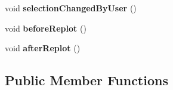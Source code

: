 \begin{DoxyCompactItemize}
\item 
void {\bfseries selection\+Changed\+By\+User} ()\hypertarget{class_q_custom_plot_a500c64a109bc773c973ad274f2fa4190}{}\label{class_q_custom_plot_a500c64a109bc773c973ad274f2fa4190}

\item 
void {\bfseries before\+Replot} ()\hypertarget{class_q_custom_plot_a0cd30e29b73efd6afe096e44bc5956f5}{}\label{class_q_custom_plot_a0cd30e29b73efd6afe096e44bc5956f5}

\item 
void {\bfseries after\+Replot} ()\hypertarget{class_q_custom_plot_a6f4fa624af060bc5919c5f266cf426a0}{}\label{class_q_custom_plot_a6f4fa624af060bc5919c5f266cf426a0}

\end{DoxyCompactItemize}
\subsection*{Public Member Functions}
